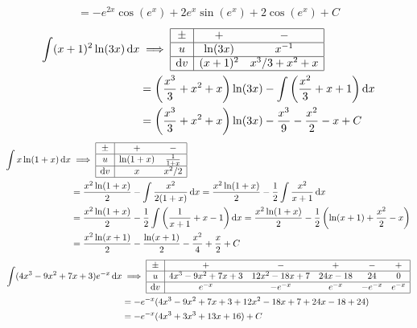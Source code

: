 \documentclass{article}
\begin{document}
\begin{tasks}[style = enumerate]
\begin{align*}
								= -e^{2x}\cos(e^x) + 2e^x\sin(e^x) + 2\cos(e^x) + C
					\end{align*}
				\task
					\begin{align*}
						\int (x + 1)^2\ln(3x) \dd{x} &\implies
								\begin{array}{|c|cc|}\hline
									\pm & + & - \\\hline
									u & \ln(3x) & x^{-1} \\\hline
									\dd{v} & (x + 1)^2 & x^3/3 + x^2 + x \\\hline
								\end{array} \\
							&= \left(\frac{x^3}{3} + x^2 + x\right)\ln(3x) - \int \left(\frac{x^2}{3} + x + 1\right) \dd{x} \\
							&= \left(\frac{x^3}{3} + x^2 + x\right)\ln(3x) - \frac{x^3}{9} - \frac{x^2}{2} - x + C
					\end{align*}
				\task
					\begin{align*}
						\int x\ln(1 + x) \dd{x} &\implies
								\begin{array}{|c|cc|}\hline
									\pm & + & - \\\hline
									u & \ln(1 + x) & \frac{1}{1 + x} \\\hline
									\dd{v} & x & x^2/2 \\\hline
								\end{array} \\
							&= \frac{x^2\ln(1 + x)}{2} - \int \frac{x^2}{2(1 + x)} \dd{x}
								= \frac{x^2\ln(1 + x)}{2} - \frac{1}{2} \int \frac{x^2}{x + 1} \dd{x} \\
							&= \frac{x^2\ln(1 + x)}{2} - \frac{1}{2} \int \left(\frac{1}{x + 1} + x - 1\right) \dd{x}
								=  \frac{x^2\ln(1 + x)}{2} - \frac{1}{2}\left(\ln(x + 1) + \frac{x^2}{2} - x\right) \\
							&= \frac{x^2\ln(x + 1)}{2} - \frac{\ln(x + 1)}{2} - \frac{x^2}{4} + \frac{x}{2} + C
					\end{align*}
				\task
					\begin{align*}
						\int (4x^3 - 9x^2 + 7x + 3)e^{-x} \dd{x} &\implies
								\begin{array}{|c|ccccc|}\hline
									\pm & + & - & + & - & + \\\hline
									u & 4x^3 - 9x^2 + 7x + 3 & 12x^2 - 18x + 7 & 24x - 18 & 24 & 0\\\hline
									\dd{v} & e^{-x} & -e^{-x} & e^{-x} & -e^{-x} & e^{-x} \\\hline
								\end{array} \\
							&= -e^{-x}(4x^3 - 9x^2 + 7x + 3 + 12x^2 - 18x + 7 + 24x - 18 + 24) \\
							&= -e^{-x}(4x^3 + 3x^3 + 13x + 16) + C
					\end{align*}
			\end{tasks}
\end{document}
